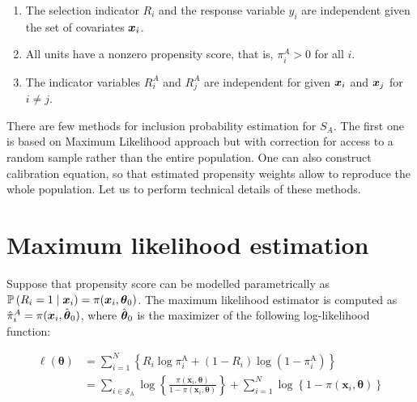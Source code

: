 \documentclass[
  letterpaper,
  DIV=11,
  numbers=noendperiod]{scrreprt}
\begin{document}
\begin{enumerate}
\def\labelenumi{\arabic{enumi}.}
\item
  The selection indicator \(R_i\) and the response variable \(y_i\) are
  independent given the set of covariates \(\boldsymbol{x}_i\).
\item
  All units have a nonzero propensity score, that is, \(\pi_i^A > 0\)
  for all \(i\).
\item
  The indicator variables \(R_i^A\) and \(R_j^A\) are independent for
  given \(\boldsymbol{x}_i\) and \(\boldsymbol{x}_j\) for \(i \neq j\).
\end{enumerate}

There are few methods for inclusion probability estimation for \(S_A\).
The first one is based on Maximum Likelihood approach but with
correction for access to a random sample rather than the entire
population. One can also construct calibration equation, so that
estimated propensity weights allow to reproduce the whole population.
Let us to perform technical details of these methods.

\section{Maximum likelihood
estimation}\label{maximum-likelihood-estimation}

Suppose that propensity score can be modelled parametrically as
\(\mathbb{P}\left(R_i=1 \mid \boldsymbol{x}_i\right) = \pi(\boldsymbol{x}_{i}, \boldsymbol{\theta}_{0})\).
The maximum likelihood estimator is computed as
\(\hat{\pi}_{i}^{A} = \pi(\boldsymbol{x}_{i}, \hat{\boldsymbol{\theta}}_{0})\), where
\(\hat{\boldsymbol{\theta}}_{0}\) is the maximizer of the following log-likelihood
function:

\[
    \begin{split}
 \ell(\boldsymbol{\theta}) & =\sum_{i=1}^N\left\{R_i \log \pi_i^{\mathrm{A}}+\left(1-R_i\right) \log \left(1-\pi_i^{\mathrm{A}}\right)\right\} \\ & =\sum_{i \in \mathcal{S}_{\mathrm{A}}} \log \left\{\frac{\pi\left(\boldsymbol{x}_i, \boldsymbol{\theta}\right)}{1-\pi\left(\boldsymbol{x}_i, \boldsymbol{\theta}\right)}\right\}+\sum_{i=1}^N \log \left\{1-\pi\left(\boldsymbol{x}_i, \boldsymbol{\theta}\right)\right\}
    \end{split}
\]
\end{document}
